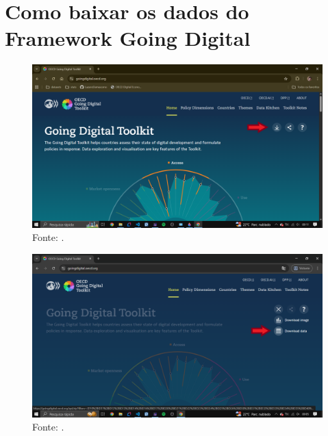 \chapter{Como baixar os dados do Framework Going Digital}
\label{como_baixar_dados_going_digital}

\begin{figure}[H]
	\centering
	\caption{}
	\includegraphics[width=1\linewidth]{figuras/primeiro_passo}
	\label{fig:primeiro_passo}
	\footnotesize{Fonte: \cite{portal_going_digital}.}
\end{figure}

\begin{figure}[H]
	\centering
	\caption{}
	\includegraphics[width=1\linewidth]{figuras/segundo_passo}
	\label{fig:segundo_passo}
	\footnotesize{Fonte: \cite{portal_going_digital}.}
\end{figure}
